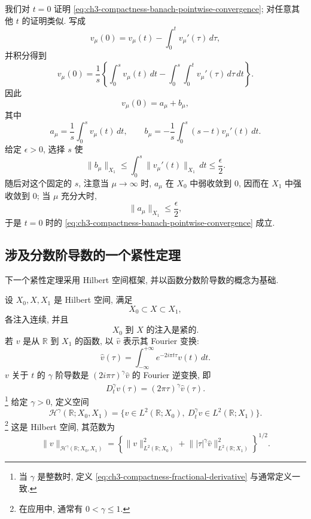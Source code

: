 \begin{Proof}
\hypertarget{chapter-03-page-200}{}
我们对 $t=0$ 证明 \eqref{eq:ch3-compactness-banach-pointwise-convergence}; 对任意其他 $t$ 的证明类似. 写成
\[
v_\mu(0)=v_\mu(t)-\int_0^t v_\mu'(\tau)\,d\tau,
\]
并积分得到
\[
v_\mu(0)=\frac1s\left\{\int_0^s v_\mu(t)\,dt
-\int_0^s\int_0^t v_\mu'(\tau)\,d\tau\,dt\right\}.
\]
因此
\begin{equation}
v_\mu(0)=a_\mu+b_\mu,
\label{eq:ch3-compactness-banach-decomposition}
\end{equation}
其中
\begin{equation}
a_\mu=\frac1s\int_0^s v_\mu(t)\,dt,
\qquad
b_\mu=-\frac1s\int_0^s(s-t)v_\mu'(t)\,dt.
\label{eq:ch3-compactness-banach-decomposition-terms}
\end{equation}
给定 $\epsilon>0$, 选择 $s$ 使
\[
\lVert b_\mu\rVert_{X_1}
\leq\int_0^s\lVert v_\mu'(t)\rVert_{X_1}\,dt
\leq\frac\epsilon2.
\]
随后对这个固定的 $s$, 注意当 $\mu\to\infty$ 时, $a_\mu$ 在 $X_0$ 中弱收敛到 $0$, 因而在 $X_1$ 中强收敛到 $0$; 当 $\mu$ 充分大时,
\[
\lVert a_\mu\rVert_{X_1}\leq\frac\epsilon2,
\]
于是 $t=0$ 时的 \eqref{eq:ch3-compactness-banach-pointwise-convergence} 成立.
\end{Proof}

\subsection{涉及分数阶导数的一个紧性定理}
\label{subsec:ch3-compactness-fractional}
下一个紧性定理采用 Hilbert 空间框架, 并以函数分数阶导数的概念为基础.

设 $X_0,X,X_1$ 是 Hilbert 空间, 满足
\begin{equation}
X_0\subset X\subset X_1,
\label{eq:ch3-compactness-hilbert-chain}
\end{equation}
各注入连续, 并且
\begin{equation}
X_0\text{ 到 }X\text{ 的注入是紧的}.
\label{eq:ch3-compactness-hilbert-compact-injection}
\end{equation}
若 $v$ 是从 $\mathbb R$ 到 $X_1$ 的函数, 以 $\widehat v$ 表示其 Fourier 变换:
\begin{equation}
\widehat v(\tau)=\int_{-\infty}^{+\infty}e^{-2i\pi t\tau}v(t)\,dt.
\label{eq:ch3-compactness-fourier-transform}
\end{equation}
$v$ 关于 $t$ 的 $\gamma$ 阶导数是 $(2i\pi\tau)^\gamma\widehat v$ 的 Fourier 逆变换, 即
\begin{equation}
\widehat{D_t^\gamma v}(\tau)=(2\pi\tau)^\gamma\widehat v(\tau).
\label{eq:ch3-compactness-fractional-derivative}
\end{equation}
\footnote{当 $\gamma$ 是整数时, 定义 \eqref{eq:ch3-compactness-fractional-derivative} 与通常定义一致.}
给定 $\gamma>0$, 定义空间
\begin{equation}
\mathcal H^\gamma(\mathbb R;X_0,X_1)
=\{v\in L^2(\mathbb R;X_0),\ D_t^\gamma v\in L^2(\mathbb R;X_1)\}.
\label{eq:ch3-compactness-fractional-space}
\end{equation}
\footnote{在应用中, 通常有 $0<\gamma\leq1$.}
这是 Hilbert 空间, 其范数为
\[
\lVert v\rVert_{\mathcal H^\gamma(\mathbb R;X_0,X_1)}
=\left\{\lVert v\rVert_{L^2(\mathbb R;X_0)}^2
+\lVert |\tau|^\gamma\widehat v\rVert_{L^2(\mathbb R;X_1)}^2\right\}^{1/2}.
\]

